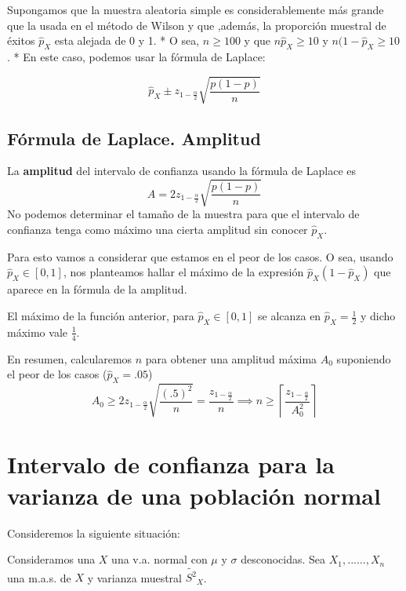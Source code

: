 \documentclass[
]{article}
\begin{document}
Supongamos que la muestra aleatoria simple es considerablemente más
grande que la usada en el método de Wilson y que ,además, la proporción
muestral de éxitos \(\hat{p}_X\) esta alejada de 0 y 1. * O sea,
\(n \geq 100\) y que \(n\hat{p}_X \geq 10\) y \(n(1-\hat{p}_X \geq 10\).
* En este caso, podemos usar la fórmula de Laplace:

\[\hat{p}_X \pm z_{1-\frac{\alpha}{2}}\sqrt{\frac{p(1-p)}{n}}\]

\hypertarget{fuxf3rmula-de-laplace.-amplitud}{%
\subsection{Fórmula de Laplace.
Amplitud}\label{fuxf3rmula-de-laplace.-amplitud}}

La \textbf{amplitud} del intervalo de confianza usando la fórmula de
Laplace es \[A = 2z_{1-\frac{\alpha}{2}}\sqrt{\frac{p(1-p)}{n}}\] No
podemos determinar el tamaño de la muestra para que el intervalo de
confianza tenga como máximo una cierta amplitud sin conocer
\(\hat{p}_X\).

Para esto vamos a considerar que estamos en el peor de los casos. O sea,
usando \(\hat{p}_X \in [0,1]\), nos planteamos hallar el máximo de la
expresión \(\hat{p}_X(1-\hat{p}_X)\) que aparece en la fórmula de la
amplitud.

El máximo de la función anterior, para \(\hat{p}_X \in [0,1]\) se
alcanza en \(\hat{p}_X = \frac{1}{2}\) y dicho máximo vale
\(\frac{1}{4}\).

En resumen, calcularemos \(n\) para obtener una amplitud máxima \(A_0\)
suponiendo el peor de los casos (\(\hat{p}_X = .05\))
\[A_0 \geq 2z_{1-\frac{\alpha}{2}}\sqrt{\frac{(.5)^2}{n}} = \frac{z_{1-\frac{\alpha}{2}}}{n} \implies n \geq \left\lceil  \frac{z_{1-\frac{\alpha}{2}}}{A_0^2} \right\rceil\]

\hypertarget{intervalo-de-confianza-para-la-varianza-de-una-poblaciuxf3n-normal}{%
\section{Intervalo de confianza para la varianza de una población
normal}\label{intervalo-de-confianza-para-la-varianza-de-una-poblaciuxf3n-normal}}

Consideremos la siguiente situación:

Consideramos una \(X\) una v.a. normal con \(\mu\) y \(\sigma\)
desconocidas. Sea \(X_1,......,X_n\) una m.a.s. de \(X\) y varianza
muestral \(\tilde{S^2}_X\).
\end{document}
